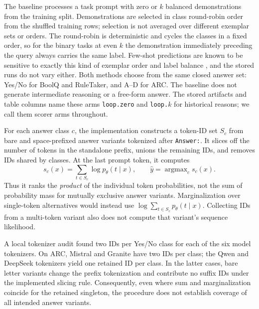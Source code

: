 The baseline processes a task prompt with zero or $k$ balanced demonstrations
from the training split. Demonstrations are selected in class round-robin
order from the shuffled training rows; selection is not averaged over
different exemplar sets or orders. The round-robin is deterministic and
cycles the classes in a fixed order, so for the binary tasks at even $k$ the
demonstration immediately preceding the query always carries the same label.
Few-shot predictions are known to be sensitive to exactly this kind of
exemplar order and label balance \citep{zhao2021calibrate}, and the stored
runs do not vary either. Both methods choose from the same closed
answer set: Yes/No for BoolQ and RuleTaker, and A--D for ARC. The baseline
does not generate intermediate reasoning or a free-form answer. The stored
artifacts and table columns name these arms \texttt{loop.zero} and
\texttt{loop.$k$} for historical reasons; we call them scorer arms
throughout.

For each answer class $c$, the implementation constructs a token-ID set
$S_c$ from bare and space-prefixed answer variants tokenized after
\texttt{Answer:}. It slices off the number of tokens in the standalone
prefix, unions the remaining IDs, and removes IDs shared by classes.
At the last prompt token, it computes
\begin{equation}
s_c(x)=\sum_{t\in S_c}\log p_\theta(t\mid x),\qquad
\hat{y}=\mathop{\mathrm{argmax}}_c s_c(x).
\end{equation}
Thus it ranks the \emph{product} of the individual token probabilities, not
the sum of probability mass for mutually exclusive answer variants.
Marginalization over single-token alternatives would instead use
$\log\sum_{t\in S_c}p_\theta(t\mid x)$. Collecting IDs from a multi-token
variant also does not compute that variant's sequence likelihood.

A local tokenizer audit found two IDs per Yes/No class for each of the six
model tokenizers. On ARC, Mistral and Granite have two IDs per class; the
Qwen and DeepSeek tokenizers yield one retained ID per class. In the latter
cases, bare letter variants change the prefix tokenization and contribute
no suffix IDs under the implemented slicing rule. Consequently, even where
sum and marginalization coincide for the retained singleton, the procedure
does not establish coverage of all intended answer variants.

